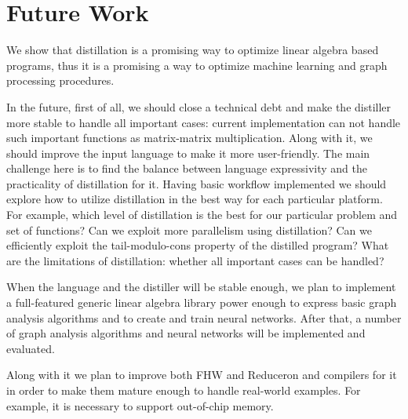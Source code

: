 \section{Future Work}

We show that distillation is a promising way to optimize linear algebra based programs, thus it is a promising a way to optimize machine learning and graph processing procedures.

In the future, first of all, we should close a technical debt and make the distiller more stable to handle all important cases: current implementation can not handle such important functions as matrix-matrix multiplication.
Along with it, we should improve the input language to make it more user-friendly.
The main challenge here is to find the balance between language expressivity and the practicality of distillation for it.
Having basic workflow implemented we should explore how to utilize distillation in the best way for each particular platform. 
For example, which level of distillation is the best for our particular problem and set of functions?
Can we exploit more parallelism using distillation?
Can we efficiently exploit the tail-modulo-cons property of the distilled program?
What are the limitations of distillation: whether all important cases can be handled?

When the language and the distiller will be stable enough, we plan to implement a full-featured generic linear algebra library power enough to express basic graph analysis algorithms and to create and train neural networks.
After that, a number of graph analysis algorithms and neural networks will be implemented and evaluated.

Along with it we plan to improve both FHW and Reduceron and compilers for it in order to make them mature enough to handle real-world examples.
For example, it is necessary to support out-of-chip memory.